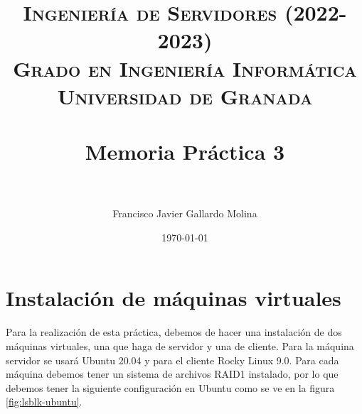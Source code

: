 
\usepackage{blindtext}
\usepackage{hyperref}
\usepackage{listings}
\usepackage{graphicx}
\graphicspath{ {images/} }

\title{	
\normalfont \normalsize 
\textsc{\textbf{Ingeniería de Servidores (2022-2023)} \\ Grado en Ingeniería Informática \\ Universidad de Granada} \\ [25pt] %
\horrule{0.5pt} \\[0.4cm] %
\huge Memoria Práctica 3 \\ %
\horrule{2pt} \\[0.5cm] %
}

\author{Francisco Javier Gallardo Molina} %

\date{\normalsize\today} %

\renewcommand{\footrulewidth}{0.4pt}
\rfoot[]{\thepage}



\maketitle

\newpage

\horrule{1pt}
\tableofcontents

\newpage

\section{Instalación de máquinas virtuales}

Para la realización de esta práctica, debemos de hacer una instalación de dos máquinas virtuales, una que haga de servidor y una de cliente. Para la máquina servidor se usará Ubuntu 20.04 y para el cliente Rocky Linux 9.0. Para cada máquina debemos tener un sistema de archivos RAID1 instalado, por lo que debemos tener la siguiente configuración en Ubuntu como se ve en la figura \ref{fig:lsblk-ubuntu}.\\

